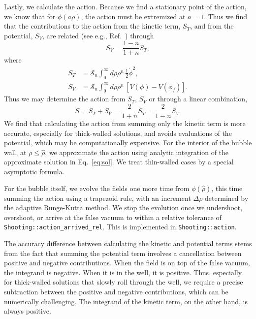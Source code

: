 \documentclass[final,3p,11pt,pdflatex]{elsarticle}
\renewcommand{\tfrac}{\frac}
\newcommand{\code}[1]{\ifmmode\text{\nolinkurl{#1}}\else\nolinkurl{#1}\fi}
\renewcommand{\refeq}[1]{Eq.~\ref{#1}}
\newcommand{\refcite}[1]{Ref.~\cite{#1}}
\newcommand{\fv}{\ensuremath{\phi_f}}
\begin{document}
Lastly, we calculate the action.  Because we find a stationary point of the action, we know that for $\phi(a\rho)$, the action must be extremized at $a=1$.  Thus we find that the contributions to the action from the kinetic term, $S_T$, and from the potential, $S_V$, are related (see e.g., \refcite{Masoumi:2016wot}) through
\begin{equation}
S_V = \frac{1 - n}{1 + n} S_T,
\end{equation}
where
\begin{align}
S_T &= \mathcal{S}_n \int_0^\infty d\rho \rho^n \, \tfrac12\dot\phi^2, \label{eq:kinetic_action}\\
S_V &= \mathcal{S}_n \int_0^\infty d\rho \rho^n \, \left[V(\phi) - V(\fv) \right].
\end{align}
Thus we may determine the action from $S_T$, $S_V$ or through a linear combination,
\begin{equation}
S = S_T + S_V = \frac{2}{1 + n} S_T = \frac{2}{1 - n} S_V.
\end{equation}
We find that calculating the action from summing only the kinetic term is more accurate,
especially for thick-walled solutions, and avoids evaluations of the potential,
which may be computationally expensive.  For the interior of the bubble wall,
at $\rho \le \hat\rho$, we approximate the action using analytic integration
of the approximate solution in \refeq{eq:sol}.  We treat thin-walled cases by
a special asymptotic formula.

For the bubble itself, we evolve the fields one more time from $\phi(\hat\rho)$,
this time summing the action using a trapezoid rule, with an increment
$\Delta\rho$ determined by the adaptive Runge-Kutta method.  We stop the
evolution once we undershoot, overshoot, or arrive at the false vacuum to within
a relative tolerance of \code{Shooting::action_arrived_rel}.  This is implemented
in \code{Shooting::action}.

The accuracy difference between calculating the kinetic and potential terms stems from the fact that summing the potential term involves
a cancellation between positive and negative contributions.  When the field
is on top of the false vacuum, the integrand is negative.  When it is in the
well, it is positive.  Thus, especially for thick-walled solutions that slowly roll through the well, we require a precise subtraction
between the positive and negative contributions, which can be numerically challenging. The integrand of the
kinetic term, on the other hand, is always positive.
\end{document}
